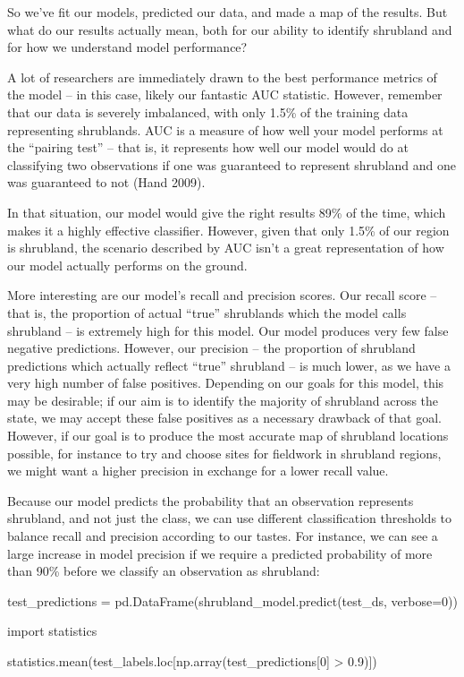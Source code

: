 \documentclass[
  letterpaper,
  DIV=11,
  numbers=noendperiod]{scrartcl}
\newenvironment{Shaded}{\begin{snugshade}}{\end{snugshade}}
\newcommand{\DecValTok}[1]{\textcolor[rgb]{0.68,0.00,0.00}{#1}}
\newcommand{\FloatTok}[1]{\textcolor[rgb]{0.68,0.00,0.00}{#1}}
\newcommand{\ImportTok}[1]{\textcolor[rgb]{0.00,0.46,0.62}{#1}}
\newcommand{\NormalTok}[1]{\textcolor[rgb]{0.00,0.23,0.31}{#1}}
\newcommand{\OperatorTok}[1]{\textcolor[rgb]{0.37,0.37,0.37}{#1}}
\begin{document}
So we've fit our models, predicted our data, and made a map of the
results. But what do our results actually mean, both for our ability to
identify shrubland and for how we understand model performance?

A lot of researchers are immediately drawn to the best performance
metrics of the model -- in this case, likely our fantastic AUC
statistic. However, remember that our data is severely imbalanced, with
only 1.5\% of the training data representing shrublands. AUC is a
measure of how well your model performs at the ``pairing test'' -- that
is, it represents how well our model would do at classifying two
observations if one was guaranteed to represent shrubland and one was
guaranteed to not (Hand 2009).

In that situation, our model would give the right results 89\% of the
time, which makes it a highly effective classifier. However, given that
only 1.5\% of our region is shrubland, the scenario described by AUC
isn't a great representation of how our model actually performs on the
ground.

More interesting are our model's recall and precision scores. Our recall
score -- that is, the proportion of actual ``true'' shrublands which the
model calls shrubland -- is extremely high for this model. Our model
produces very few false negative predictions. However, our precision --
the proportion of shrubland predictions which actually reflect ``true''
shrubland -- is much lower, as we have a very high number of false
positives. Depending on our goals for this model, this may be desirable;
if our aim is to identify the majority of shrubland across the state, we
may accept these false positives as a necessary drawback of that goal.
However, if our goal is to produce the most accurate map of shrubland
locations possible, for instance to try and choose sites for fieldwork
in shrubland regions, we might want a higher precision in exchange for a
lower recall value.

Because our model predicts the probability that an observation
represents shrubland, and not just the class, we can use different
classification thresholds to balance recall and precision according to
our tastes. For instance, we can see a large increase in model precision
if we require a predicted probability of more than 90\% before we
classify an observation as shrubland:

\begin{Shaded}
\begin{Highlighting}[]
\NormalTok{test\_predictions }\OperatorTok{=}\NormalTok{ pd.DataFrame(shrubland\_model.predict(test\_ds, verbose}\OperatorTok{=}\DecValTok{0}\NormalTok{))}

\ImportTok{import}\NormalTok{ statistics}

\NormalTok{statistics.mean(test\_labels.loc[np.array(test\_predictions[}\DecValTok{0}\NormalTok{] }\OperatorTok{\textgreater{}} \FloatTok{0.9}\NormalTok{)])}
\end{Highlighting}
\end{Shaded}
\end{document}

